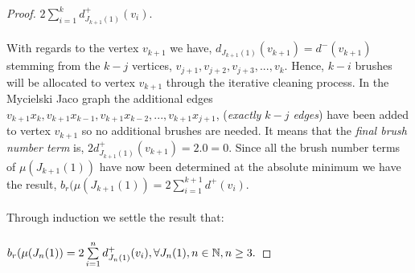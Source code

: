 \documentclass[11pt]{article}
\numberwithin{equation}{section}
\begin{document}
{\begin{proof}
$2\sum\limits_{i=1}^{k} d^+_{J_{k+1}(1)}(v_i).$\\ \\
With regards to the vertex $v_{k+1}$ we have, $d_{J_{k+1}(1)}(v_{k+1}) = d^-(v_{k+1})$ stemming from the $k-j$ vertices, $v_{j+1}, v_{j+2}, v_{j+3}, ..., v_k.$ Hence, $k-i$ brushes will be allocated to vertex $v_{k+1}$ through the iterative cleaning process. In the Mycielski Jaco graph the additional edges $v_{k+1}x_k, v_{k+1}x_{k-1}, v_{k+1}x_{k-2}, ..., v_{k+1}x_{j+1}$, (\emph{exactly $k-j$ edges}) have been added to vertex $v_{k+1}$ so no additional brushes are needed. It means that the \emph{final brush number term} is, $2d^+_{J_{k+1}(1)}(v_{k+1}) = 2.0 = 0.$ Since all the brush number terms of $\mu(J_{k+1}(1))$ have now been determined at the absolute minimum we have the result, $b_r(\mu(J_{k+1}(1)) = 2\sum\limits_{i=1}^{k+1}d^+(v_i).$\\ \\
Through induction we settle the result that:\\ \\
$b_r(\mu(J_n(1)) = 2\sum\limits_{i=1}^{n}d^+_{J_n(1)}(v_i), \forall J_n(1), n \in \Bbb N, n \geq 3.$
\end{proof}
}
\end{document}
